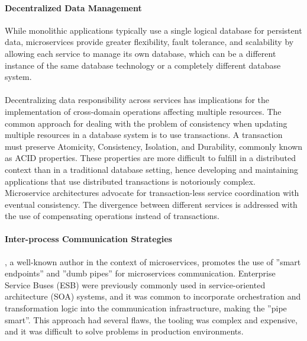 \paragraph{Decentralized Data Management}

While monolithic applications typically use a single logical database for persistent data, microservices provide greater flexibility, fault tolerance,
and scalability by allowing each service to manage its own database, which can be a different instance of the same database technology or a completely different database system.

\paragraph{}

Decentralizing data responsibility across services has implications for the implementation of cross-domain operations affecting multiple resources.
The common approach for dealing with the problem of consistency when updating multiple resources in a database system is to use transactions.
A transaction must preserve Atomicity, Consistency, Isolation, and Durability, commonly known as ACID properties.
These properties are more difficult to fulfill in a distributed context than in a traditional database setting, hence developing and maintaining applications that use distributed transactions is notoriously complex.
Microservice architectures advocate for transaction-less service coordination with eventual consistency.
The divergence between different services is addressed with the use of compensating operations instead of transactions.

\paragraph{Inter-process Communication Strategies}

\citeauthor{microservices}, a well-known author in the context of microservices, promotes the use of ''smart endpoints'' and ''dumb pipes'' for microservices communication.
Enterprise Service Buses (ESB) \cite{esb} were previously commonly used in service-oriented architecture (SOA) systems,
and it was common to incorporate orchestration and transformation logic into the communication infrastructure,
making the ''pipe smart''.
This approach had several flaws, the tooling was complex and expensive, and it was difficult to solve problems in production environments.

\paragraph{}


